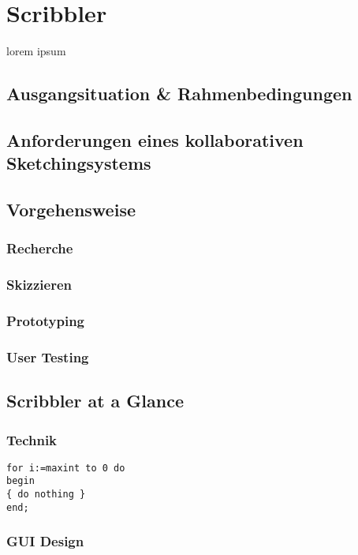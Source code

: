 \chapter{Scribbler}\label{ch:scribbler}

lorem ipsum

\section{Ausgangsituation \& Rahmenbedingungen}

\section{Anforderungen eines kollaborativen Sketchingsystems}

\section{Vorgehensweise}

\subsection{Recherche}
\subsection{Skizzieren}
\subsection{Prototyping}
\subsection{User Testing}

\section{Scribbler at a Glance}

\subsection{Technik}
\begin{lstlisting}[float,caption=A scribbler code snippet]
for i:=maxint to 0 do
begin
{ do nothing }
end;
\end{lstlisting}

\subsection{GUI Design}

